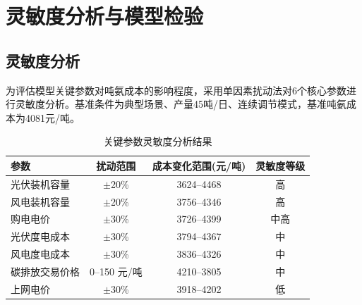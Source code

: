 \section{灵敏度分析与模型检验}

\subsection{灵敏度分析}

为评估模型关键参数对吨氨成本的影响程度，采用单因素扰动法对6个核心参数进行灵敏度分析。基准条件为典型场景、产量45吨/日、连续调节模式，基准吨氨成本为4081元/吨。



\begin{table}[H]
\centering
\caption{关键参数灵敏度分析结果}\label{tab:sensitivity}
\begin{tabular}{lccc}
\toprule
参数 & 扰动范围 & 成本变化范围(元/吨) & 灵敏度等级 \\
\midrule
光伏装机容量 & $\pm$20\% & 3624--4468 & 高 \\
风电装机容量 & $\pm$20\% & 3756--4346 & 高 \\
购电电价 & $\pm$30\% & 3726--4399 & 中高 \\
光伏度电成本 & $\pm$30\% & 3794--4367 & 中 \\
风电度电成本 & $\pm$30\% & 3836--4326 & 中 \\
碳排放交易价格 & 0--150 元/吨 & 4210--3805 & 中 \\
上网电价 & $\pm$30\% & 3918--4202 & 低 \\
\bottomrule
\end{tabular}
\end{table}

